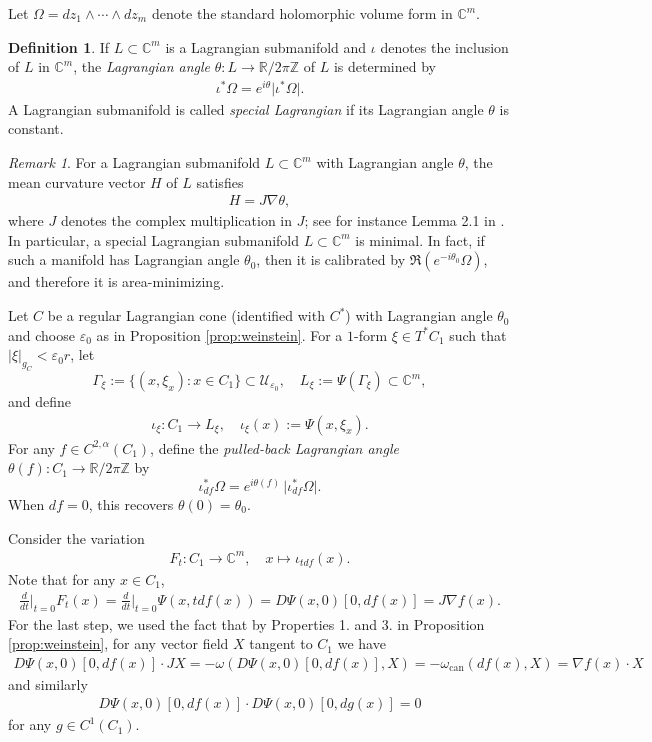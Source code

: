 \documentclass[11pt]{amsart}
\theoremstyle{definition}
\newtheorem{definition}{Definition}
\theoremstyle{remark}
\newtheorem{remark}{Remark}
\newcommand{\C}{\mathbb{C}}
\newcommand{\R}{\mathbb{R}}
\begin{document}
Let $\Omega = dz_1\wedge\cdots\wedge dz_m$ denote the standard holomorphic volume form in $\C^m$.
\begin{definition}
    If $L\subset\C^m$ is a Lagrangian submanifold and $\iota$ denotes the inclusion of $L$ in $\C^m$, the \emph{Lagrangian angle} $\theta: L\to  \R/2\pi\mathbb{Z}$ of $L$ is determined by
    \begin{align*}
        \iota^\ast\Omega=e^{i\theta}\lvert\iota^\ast\Omega\rvert.
    \end{align*}
    A Lagrangian submanifold is called \emph{special Lagrangian} if its Lagrangian angle $\theta$ is constant.
\end{definition}
\begin{remark}\label{rmk: mean-curvature-lagrangian-angle}
    For a Lagrangian submanifold $L\subset \C^m$ with Lagrangian angle $\theta$, the mean curvature vector $H$ of $L$ satisfies
    \begin{align*}
        H=J\nabla \theta,
    \end{align*}
    where $J$ denotes the complex multiplication in $J$; see for instance Lemma 2.1 in \cite{Thomas-Yau}. In particular, a special Lagrangian submanifold $L\subset\C^m$ is minimal. In fact, if such a manifold has Lagrangian angle $\theta_0$, then it is calibrated by $\Re(e^{-i\theta_0}\Omega)$, and therefore it is area-minimizing.
\end{remark}
Let $C$ be a regular Lagrangian cone (identified with $C^*$) with Lagrangian angle $\theta_0$ and choose $\varepsilon_0$ as in Proposition \ref{prop:weinstein}. For a $1$-form $\xi \in T^\ast C_1$ such that $|\xi|_{g_C}<\varepsilon_0 r$, let
\[
\Gamma_\xi:=\{(x,\xi_x):x\in C_{1}\}\subset \mathcal{U}_{\varepsilon_0},
\quad
L_\xi:=\Psi(\Gamma_\xi)\subset \C^m,
\]
and define
\begin{align*}
    \iota_\xi:C_{1}\to L_\xi,\quad \iota_\xi(x):=\Psi(x,\xi_x).
\end{align*} 
For any $f\in C^{2,\alpha}(C_{1})$, define the \emph{pulled-back Lagrangian angle} $\theta(f):C_{1}\to\R/2\pi\mathbb{Z}$ by
\[
\iota_{df}^\ast \Omega = e^{i\theta(f)}\,\big|\iota_{df}^\ast\Omega\big|.
\]
When $df=0$, this recovers $\theta(0)=\theta_0$. 

Consider the variation
\begin{align*}
    F_t: C_{1}\to\mathbb{C}^m,\quad x\mapsto \iota_{tdf}(x).
\end{align*}
Note that for any $x\in C_{1}$,
\begin{align}\label{eq: hamiltonian-variation}
    \frac{d}{dt}\bigg\vert_{t=0}F_t(x)=\frac{d}{dt}\bigg\vert_{t=0}\Psi(x, tdf(x))=D\Psi(x,0)[0,df(x)]=J\nabla f(x).
\end{align}
For the last step, we used the fact that by Properties 1. and 3. in Proposition \ref{prop:weinstein}, for any vector field $X$ tangent to $C_1$ we have
\begin{align*}
    D\Psi(x,0)[0, df(x)]\cdot JX=-\omega(D\Psi(x,0)[0,df(x)], X)=-\omega_{\text{can}}(df(x), X)=\nabla f(x)\cdot X
\end{align*}
and similarly
\begin{align*}
    D\Psi(x,0)[0, df(x)]\cdot D\Psi(x,0)[0, dg(x)]=0
\end{align*}
for any $g\in C^1(C_1)$.
\end{document}
